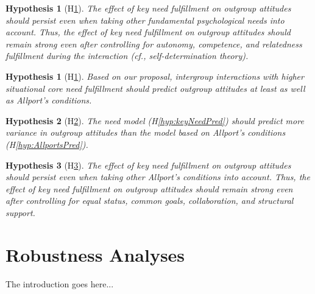 \documentclass[man, 12pt, a4paper, mask]{apa7}
\theoremstyle{break}
\theoremstyle{plain}
\newtheorem{hyp}{Hypothesis}
\newtheorem{subhyp}{Hypothesis}
\begin{document}
\begin{subhyp}[H\ref{hyp:keyNeedSDT}] \label{hyp:keyNeedSDT}
\addtolength{\leftskip}{2.5em}
The effect of key need fulfillment on outgroup attitudes should persist even when taking other fundamental psychological needs into account. Thus, the effect of key need fulfillment on outgroup attitudes should remain strong even after controlling for autonomy, competence, and relatedness fulfillment during the interaction (cf., self-determination theory). 
\end{subhyp}

\begin{hyp}[H\ref{hyp:comparison}] \label{hyp:comparison}
Based on our proposal, intergroup interactions with higher situational core need fulfillment should predict outgroup attitudes at least as well as Allport's conditions.
\end{hyp}

\setcounter{subhyp}{0}
\begin{subhyp}[H\ref{hyp:compModel}] \label{hyp:compModel}
\addtolength{\leftskip}{2.5em}
The need model (H\ref{hyp:keyNeedPred}) should predict more variance in outgroup attitudes than the model based on Allport's conditions (H\ref{hyp:AllportsPred}).
\end{subhyp}

\begin{subhyp}[H\ref{hyp:compTogether}] \label{hyp:compTogether}
\addtolength{\leftskip}{2.5em}
The  effect of key need fulfillment on outgroup attitudes should  persist even when taking other Allport's conditions into account. Thus, the effect of key need fulfillment on outgroup attitudes should remain strong even after controlling for equal status, common goals, collaboration, and structural support.  
\end{subhyp}



\section{Robustness Analyses}
\label{app:AppendixRobustness}

The introduction goes here...




\end{document}
